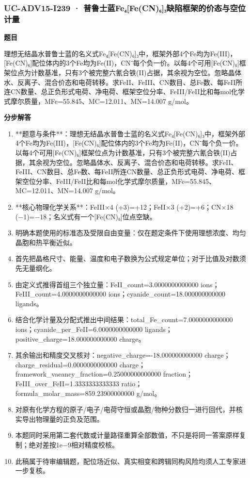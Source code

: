 \documentclass[UTF8,11pt,a4paper]{ctexart}
\begin{document}
\subsubsection*{UC-ADV15-I239 · 普鲁士蓝Fe₄[Fe(CN)₆]₃缺陷框架的价态与空位计量}
\noindent\textbf{题目}\par
理想无结晶水普鲁士蓝的名义式Fe₄[Fe(CN)₆]₃中，框架外部4个Fe均为Fe(III)，[Fe(CN)₆]配位体内的3个Fe均为Fe(II)，CN⁻每个负一价。以每4个可用[Fe(CN)₆]框架位点为计数基准，只有3个被完整六氰合铁(II)占据，其余视为空位。忽略晶体水、反离子、混合价态和电荷转移。求FeII、FeIII、CN数目、总Fe数、每FeII所连CN数量、总正负形式电荷、净电荷、框架空位分率、FeIII/FeII比和每mol化学式摩尔质量，MFe=55.845、MC=12.011、MN=14.007 g/mol。\par
\medskip\noindent\textbf{分步解答}
\begin{enumerate}
\item **题意与条件**：理想无结晶水普鲁士蓝的名义式Fe₄[Fe(CN)₆]₃中，框架外部4个Fe均为Fe(III)，[Fe(CN)₆]配位体内的3个Fe均为Fe(II)，CN⁻每个负一价。以每4个可用[Fe(CN)₆]框架位点为计数基准，只有3个被完整六氰合铁(II)占据，其余视为空位。忽略晶体水、反离子、混合价态和电荷转移。求FeII、FeIII、CN数目、总Fe数、每FeII所连CN数量、总正负形式电荷、净电荷、框架空位分率、FeIII/FeII比和每mol化学式摩尔质量，MFe=55.845、MC=12.011、MN=14.007 g/mol。
\item **核心物理化学关系**：FeIII×4 (+3)=+12；FeII×3 (+2)=+6；CN×18 (−1)=−18；名义式有一个[Fe(CN)₆]位点空缺。
\item 明确本题使用的标准态及受限自由变量：仅在题定条件下使用理想浓度、均匀晶胞和热平衡近似。
\item 首先把晶格尺寸、能量、温度和电子数换为公式规定单位；对于比值及对数须先无量纲化。
\item 由定义式推得首组三个独立量：FeII\_count=3.0000000000000 ions；FeIII\_count=4.0000000000000 ions；cyanide\_count=18.000000000000 ligands。
\item 结合化学计量及分配式推出中间结果：total\_Fe\_count=7.0000000000000 ions；cyanide\_per\_FeII=6.0000000000000 ligands；positive\_charge=18.000000000000 charge。
\item 其余输出和精度交叉核对：negative\_charge=-18.000000000000 charge；charge\_residual=0.0000000000000 charge；framework\_vacancy\_fraction=0.25000000000000 fraction；FeIII\_over\_FeII=1.3333333333333 ratio；formula\_molar\_mass=859.23900000000 g/mol。
\item 对原有化学方程的原子/电子/电荷守恒或晶胞/物种分数归一进行回代，并核实导出物理量的正负及范围。
\item 本题同时采用第二套代数或计量路径重算全部数值，不只是将同一答案原样复制；绝对差按1e−9相对精度校核。
\item 此稿属于待审编辑题，配位场近似、真实相变和跨辑同构风险均须人工专家进一步复核。
\end{enumerate}
\end{document}
